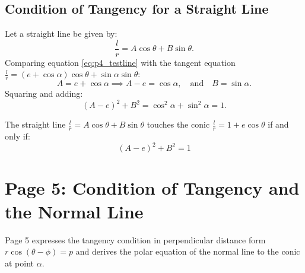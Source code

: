 \subsection{Condition of Tangency for a Straight Line}
Let a straight line be given by:
\begin{equation}
    \frac{l}{r} = A\cos\theta + B\sin\theta. \label{eq:p4_testline}
\end{equation}
Comparing equation \eqref{eq:p4_testline} with the tangent equation $\frac{l}{r} = (e + \cos\alpha)\cos\theta + \sin\alpha\sin\theta$:
\begin{equation}
    A = e + \cos\alpha \implies A - e = \cos\alpha, \quad \text{and} \quad B = \sin\alpha.
\end{equation}
Squaring and adding:
\begin{equation}
    (A - e)^2 + B^2 = \cos^2\alpha + \sin^2\alpha = 1.
\end{equation}

\begin{theorembox}
The straight line $\frac{l}{r} = A\cos\theta + B\sin\theta$ touches the conic $\frac{l}{r} = 1 + e\cos\theta$ if and only if:
\begin{equation}
    \boxed{(A - e)^2 + B^2 = 1}
\end{equation}
\end{theorembox}

\newpage
\section{Page 5: Condition of Tangency and the Normal Line}
\label{sec:page05}

\begin{conceptbox}
Page 5 expresses the tangency condition in perpendicular distance form $r\cos(\theta-\phi) = p$ and derives the polar equation of the normal line to the conic at point $\alpha$.
\end{conceptbox}

